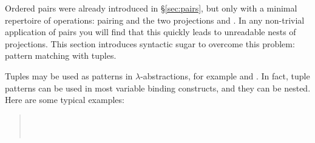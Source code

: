 %
\begin{isabellebody}%
\def\isabellecontext{Pairs}%
%
\isadelimtheory
%
\endisadelimtheory
%
\isatagtheory
%
\endisatagtheory
{\isafoldtheory}%
%
\isadelimtheory
%
\endisadelimtheory
%
\isamarkuptrue%
%
\begin{isamarkuptext}%
\label{sec:products}
Ordered pairs were already introduced in \S\ref{sec:pairs}, but only with a minimal
repertoire of operations: pairing and the two projections  and
. In any non-trivial application of pairs you will find that this
quickly leads to unreadable nests of projections. This
section introduces syntactic sugar to overcome this
problem: pattern matching with tuples.%
\end{isamarkuptext}%
\isamarkuptrue%
%
\isamarkuptrue%
%
\begin{isamarkuptext}%
Tuples may be used as patterns in $\lambda$-abstractions,
for example  and . In fact,
tuple patterns can be used in most variable binding constructs,
and they can be nested. Here are
some typical examples:
\begin{quote}
\\
\\

\end{quote}
\end{isamarkuptext}
\end{isabellebody}
